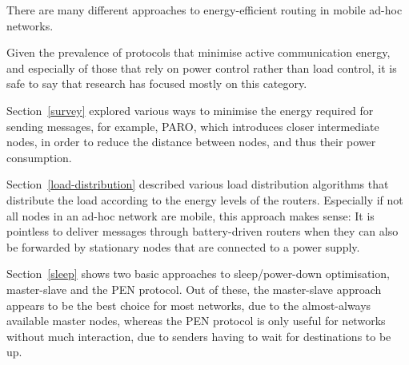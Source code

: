 There are many different approaches to energy-efficient routing in
mobile ad-hoc networks.

Given the prevalence of protocols that minimise active communication energy,
and especially of those that rely on power control rather than load control, it
is safe to say that research has focused mostly on this category.

Section~\ref{survey} explored various ways to minimise the energy required for sending
messages, for example, PARO, which introduces closer intermediate nodes,
in order to reduce the distance between nodes, and thus their
power consumption.

Section~\ref{load-distribution} described various load distribution algorithms that distribute
the load according to the energy levels of the routers. Especially if not all
nodes in an ad-hoc network are mobile, this approach makes sense: It is
pointless to deliver messages through battery-driven routers when they can
also be forwarded by stationary nodes that are connected to a power supply.

Section~\ref{sleep} shows two basic approaches to sleep/power-down optimisation, master-slave
and the PEN protocol. Out of these, the master-slave approach appears to be the
best choice for most networks, due to the almost-always available master nodes,
whereas the PEN protocol is only useful for networks without much interaction,
due to senders having to wait for destinations to be up.
